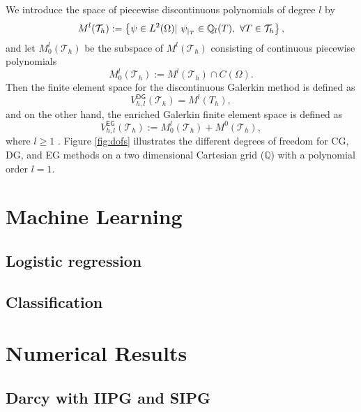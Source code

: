 \documentclass{article}
\begin{document}
We  introduce the space of piecewise discontinuous polynomials of degree $l$ by
\begin{equation}
M^l(\mathcal{T}_h) := \left \{ \psi \in L^2(\Omega) | \ \psi_{|_{T}} \in \mathbb{Q}_l(T), \ \forall T \in \mathcal{T}_h \right \}, 
\end{equation}
and let $M_0^l(\mathcal{T}_h)$ be the subspace of $M^l(\mathcal{T}_h)$ consisting of continuous piecewise polynomials
\begin{equation*}
M_0^l(\mathcal{T}_h) := M^l(\mathcal{T}_h) \cap {C}(\Omega). 
\end{equation*}
Then the finite element space for the discontinuous Galerkin method is defined as 
\begin{equation}
V^{\textsf{DG}}_{h,l} (\mathcal{T}_h) =M^l (T_h), 
\end{equation}
and on the other hand, the enriched Galerkin finite element space is defined as
\begin{equation}
V_{h,l}^{\textsf{EG}}(\mathcal{T}_h)  := M^l_0(\mathcal{T}_h) + M^0(\mathcal{T}_h),
\end{equation}
where $l \geq 1$ \cite{BecBurHansLar2003,LeeLeeWhi15,sunliu2009}.
Figure \ref{fig:dofs} illustrates the different degrees of freedom for CG, DG, and EG methods on a two dimensional Cartesian grid ($\mathbb{Q}$) with a polynomial order $l=1$. 



\section{Machine Learning}

\subsection{Logistic regression}

\subsection{Classification}

\section{Numerical Results}

\subsection{Darcy with IIPG and SIPG}
\end{document}
